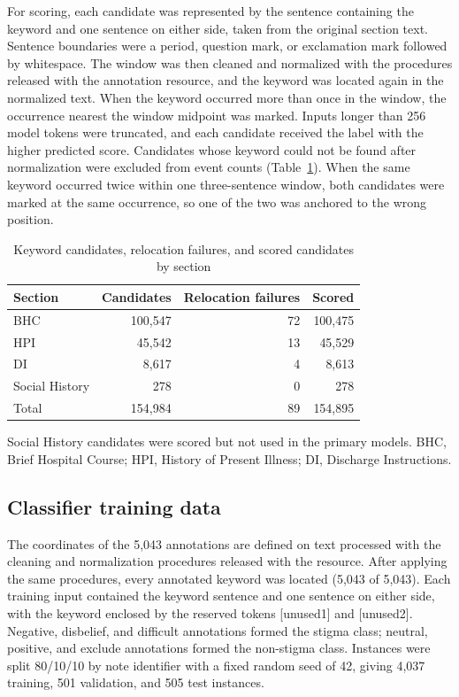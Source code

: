 \documentclass[unnumsec,webpdf,contemporary,large]{oup-authoring-template}
\begin{document}
For scoring, each candidate was represented by the sentence containing the keyword and one sentence on either side, taken from the original section text. Sentence boundaries were a period, question mark, or exclamation mark followed by whitespace. The window was then cleaned and normalized with the procedures released with the annotation resource, and the keyword was located again in the normalized text. When the keyword occurred more than once in the window, the occurrence nearest the window midpoint was marked. Inputs longer than 256 model tokens were truncated, and each candidate received the label with the higher predicted score. Candidates whose keyword could not be found after normalization were excluded from event counts (Table~\ref{tab:s_candidates}). When the same keyword occurred twice within one three-sentence window, both candidates were marked at the same occurrence, so one of the two was anchored to the wrong position.

\begin{table}[H]
\caption{Keyword candidates, relocation failures, and scored candidates by section}
\label{tab:s_candidates}
\centering
\small
\begin{tabular}{lrrr}
\toprule
Section & Candidates & Relocation failures & Scored \\
\midrule
BHC & 100,547 & 72 & 100,475 \\
HPI & 45,542 & 13 & 45,529 \\
DI & 8,617 & 4 & 8,613 \\
Social History & 278 & 0 & 278 \\
\midrule
Total & 154,984 & 89 & 154,895 \\
\bottomrule
\end{tabular}
\begin{tablenotes}
\item Social History candidates were scored but not used in the primary models. BHC, Brief Hospital Course; HPI, History of Present Illness; DI, Discharge Instructions.
\end{tablenotes}
\end{table}

\subsection{Classifier training data}

The coordinates of the 5,043 annotations are defined on text processed with the cleaning and normalization procedures released with the resource. After applying the same procedures, every annotated keyword was located (5,043 of 5,043). Each training input contained the keyword sentence and one sentence on either side, with the keyword enclosed by the reserved tokens [unused1] and [unused2]. Negative, disbelief, and difficult annotations formed the stigma class; neutral, positive, and exclude annotations formed the non-stigma class. Instances were split 80/10/10 by note identifier with a fixed random seed of 42, giving 4,037 training, 501 validation, and 505 test instances.
\end{document}
